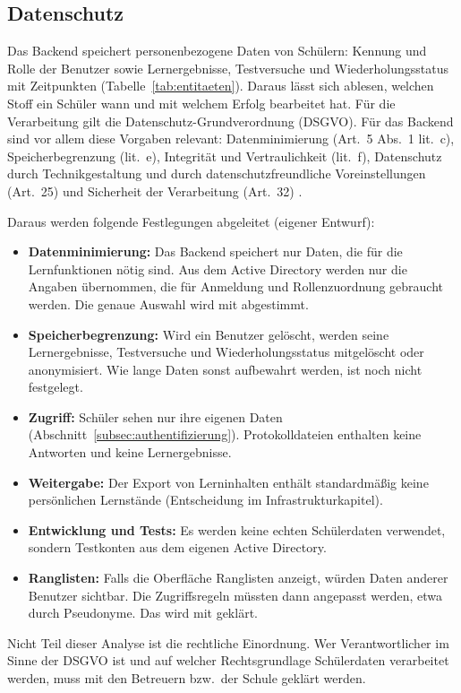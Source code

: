 \subsection{Datenschutz}
\label{subsec:datenschutz}
Das Backend speichert personenbezogene Daten von Schülern: Kennung und Rolle der Benutzer sowie Lernergebnisse, Testversuche und Wiederholungsstatus mit Zeitpunkten (Tabelle~\ref{tab:entitaeten}). Daraus lässt sich ablesen, welchen Stoff ein Schüler wann und mit welchem Erfolg bearbeitet hat. Für die Verarbeitung gilt die Datenschutz-Grundverordnung (DSGVO). Für das Backend sind vor allem diese Vorgaben relevant: Datenminimierung (Art.~5 Abs.~1 lit.~c), Speicherbegrenzung (lit.~e), Integrität und Vertraulichkeit (lit.~f), Datenschutz durch Technikgestaltung und durch datenschutzfreundliche Voreinstellungen (Art.~25) und Sicherheit der Verarbeitung (Art.~32) \parencite{eurlexDsgvo}.
 
Daraus werden folgende Festlegungen abgeleitet (eigener Entwurf):
\begin{itemize}
    \item \textbf{Datenminimierung:} Das Backend speichert nur Daten, die für die Lernfunktionen nötig sind. Aus dem Active Directory werden nur die Angaben übernommen, die für Anmeldung und Rollenzuordnung gebraucht werden. Die genaue Auswahl wird mit \Jai abgestimmt.
    \item \textbf{Speicherbegrenzung:} Wird ein Benutzer gelöscht, werden seine Lernergebnisse, Testversuche und Wiederholungsstatus mitgelöscht oder anonymisiert. Wie lange Daten sonst aufbewahrt werden, ist noch nicht festgelegt.
    \item \textbf{Zugriff:} Schüler sehen nur ihre eigenen Daten (Abschnitt~\ref{subsec:authentifizierung}). Protokolldateien enthalten keine Antworten und keine Lernergebnisse.
    \item \textbf{Weitergabe:} Der Export von Lerninhalten enthält standardmäßig keine persönlichen Lernstände (Entscheidung im Infrastrukturkapitel).
    \item \textbf{Entwicklung und Tests:} Es werden keine echten Schülerdaten verwendet, sondern Testkonten aus dem eigenen Active Directory.
    \item \textbf{Ranglisten:} Falls die Oberfläche Ranglisten anzeigt, würden Daten anderer Benutzer sichtbar. Die Zugriffsregeln müssten dann angepasst werden, etwa durch Pseudonyme. Das wird mit \Jakob geklärt.
\end{itemize}
Nicht Teil dieser Analyse ist die rechtliche Einordnung. Wer Verantwortlicher im Sinne der DSGVO ist und auf welcher Rechtsgrundlage Schülerdaten verarbeitet werden, muss mit den Betreuern bzw.\ der Schule geklärt werden.
 


